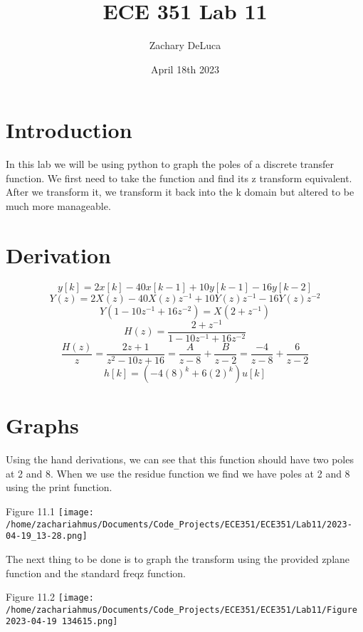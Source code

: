 \documentclass[12pt,a4paper]{article}
\title{ECE 351 Lab 11}
\author{Zachary DeLuca}
\date{April 18th 2023}
\begin{document}
	
\maketitle
\hline
\section*{Introduction}
	In this lab we will be using python to graph the poles of a discrete transfer function. We first need to take the function and find its z transform equivalent. After we transform it, we transform it back into the k domain but altered to be much more manageable.  

\section*{Derivation}

$$y[k] = 2x[k] - 40x[k - 1] + 10y[k - 1] - 16y[k - 2]$$
$$Y(z)=2X(z)-40X(z)z^{-1}+10Y(z)z^{-1}-16Y(z)z^{-2}$$
$$Y(1-10z^{-1}+16z^{-2})=X(2+z^{-1})$$
$$H(z)=\frac{2+z^{-1}}{1-10z^{-1}+16z^{-2}}$$
$$\frac{H(z)}{z}=\frac{2z+1}{z^2-10z+16}=\frac{A}{z-8}+\frac{B}{z-2}=\frac{-4}{z-8}+\frac{6}{z-2}$$
$$h[k]=(-4(8)^k+6(2)^k)u[k]$$


\section*{Graphs}

Using the hand derivations, we can see that this function should have two poles at 2 and 8. When we use the residue function we find we have poles at 2 and 8 using the print function. \vspace*{12pt}

\begin{center}
	{Figure 11.1}
	\texttt{[image: /home/zachariahmus/Documents/Code\_Projects/ECE351/ECE351/Lab11/2023-04-19\_13-28.png]}
\end{center}

The next thing to be done is to graph the transform using the provided zplane function and the standard freqz function. 

\begin{center}
	{Figure 11.2}
	\texttt{[image: /home/zachariahmus/Documents/Code\_Projects/ECE351/ECE351/Lab11/Figure 2023-04-19 134615.png]}
\end{center}
\vspace{12pt}
\end{document}
